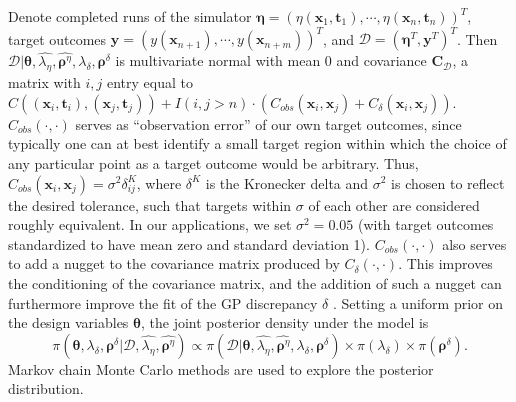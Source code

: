\documentclass[12pt]{article}
\begin{document}
%
Denote completed runs of the simulator $\boldsymbol \eta = (\eta(\mathbf x_1,\mathbf t_1),\cdots,\eta(\mathbf x_n,\mathbf t_n))^T$, target outcomes $\mathbf y = (y(\mathbf x_{n+1}),\cdots,y(\mathbf x_{n+m}))^T$, 
and $\mathcal D = (\boldsymbol \eta^T,\mathbf y^T)^T$.
%
Then $\mathcal D | \boldsymbol \theta,\widehat{\lambda_\eta}, \widehat{\boldsymbol \rho^\eta},\lambda_\delta,\boldsymbol \rho^\delta$ is multivariate normal with mean 0 and covariance $\mathbf C_\mathcal D$, a matrix with $i,j$ entry equal to 
$
C((\mathbf x_i,\mathbf t_i),(\mathbf x_j,\mathbf t_j)) + I(i,j>n)\cdot(C_{obs}(\mathbf x_i,\mathbf x_j) + C_\delta(\mathbf x_i,\mathbf x_j)).
$
%
$C_{obs}(\cdot,\cdot)$ serves as ``observation error'' of our own target outcomes, since typically one can at best identify a small target region within which the choice of any particular point as a target outcome would be arbitrary.
%
Thus, $C_{obs}(\mathbf x_i,\mathbf x_j) = \sigma^2\delta^K_{ij}$, where $\delta^K$ is the Kronecker delta and $\sigma^2$ is chosen to reflect the desired tolerance, such that targets within $\sigma$ of each other are considered roughly equivalent.
%
%
In our applications, we set $\sigma^2=0.05$ (with target outcomes standardized to have mean zero and standard deviation 1).
%
$C_{obs}(\cdot,\cdot)$ also serves to add a nugget to the covariance matrix produced by $C_\delta(\cdot,\cdot)$.
%
This improves the conditioning of the covariance matrix, and the addition of such a nugget can furthermore improve the fit of the GP discrepancy $\delta$ \citep{Gramacy2012}.
%
Setting a uniform prior on the design variables $\boldsymbol\theta$, the joint posterior density under the model is
%
\begin{equation} \label{eq:full_dist}
\pi(\boldsymbol \theta,\lambda_\delta,\boldsymbol \rho^\delta|\mathcal D,\widehat{\lambda_\eta},\widehat{\boldsymbol \rho^\eta})
\propto \pi(\mathcal D | \boldsymbol \theta,\widehat{\lambda_\eta}, \widehat{\boldsymbol \rho^\eta},\lambda_\delta,\boldsymbol \rho^\delta) \times %
\pi(\lambda_\delta) \times \pi(\boldsymbol \rho^\delta).
\end{equation}
%
Markov chain Monte Carlo methods are used to explore the posterior distribution.
\end{document}
